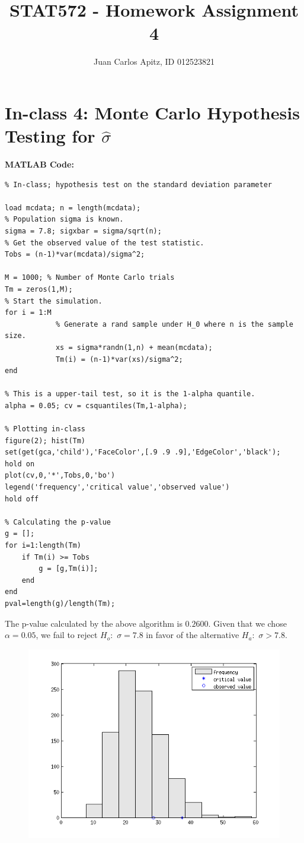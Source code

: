 \documentclass[12pt,a4paper]{article}
\author{Juan Carlos Apitz, ID 012523821}
\title{STAT572 - Homework Assignment 4}
\begin{document}
\maketitle

\section*{In-class 4: Monte Carlo Hypothesis Testing for $\hat{\sigma}$}
\textbf{MATLAB Code:}
\begin{verbatim}
% In-class; hypothesis test on the standard deviation parameter

load mcdata; n = length(mcdata);  								
% Population sigma is known.
sigma = 7.8; sigxbar = sigma/sqrt(n);
% Get the observed value of the test statistic.
Tobs = (n-1)*var(mcdata)/sigma^2;

M = 1000; % Number of Monte Carlo trials
Tm = zeros(1,M);
% Start the simulation.
for i = 1:M
			% Generate a rand sample under H_0 where n is the sample size.
			xs = sigma*randn(1,n) + mean(mcdata);
			Tm(i) = (n-1)*var(xs)/sigma^2;
end

% This is a upper-tail test, so it is the 1-alpha quantile.
alpha = 0.05; cv = csquantiles(Tm,1-alpha);

% Plotting in-class
figure(2); hist(Tm)
set(get(gca,'child'),'FaceColor',[.9 .9 .9],'EdgeColor','black');
hold on
plot(cv,0,'*',Tobs,0,'bo')
legend('frequency','critical value','observed value')
hold off

% Calculating the p-value
g = [];
for i=1:length(Tm)
    if Tm(i) >= Tobs
        g = [g,Tm(i)];
    end
end
pval=length(g)/length(Tm);
\end{verbatim}

The p-value calculated by the above algorithm is $0.2600$. Given that we chose $\alpha=0.05$, we fail to reject $H_o:$ $\sigma=7.8$ in favor of the alternative $H_a:$ $\sigma>7.8$.

\begin{figure}[ht!] 
\begin{center}
\includegraphics[scale=1]{inClass4_hist.png}
\caption{}
\label{inclass4 fig1}
\end{center}
\end{figure}
\FloatBarrier
\end{document}
